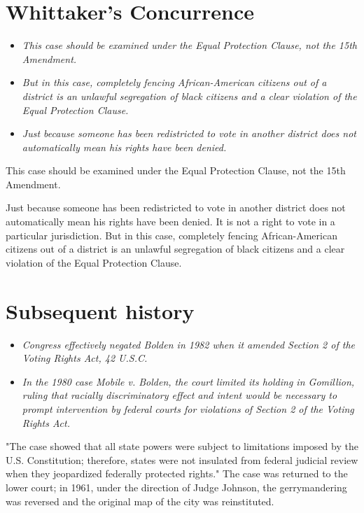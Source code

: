 \section{Whittaker's Concurrence}\label{whittakers-concurrence}

\begin{itemize}
\item
  \emph{This case should be examined under the Equal Protection Clause,
  not the 15th Amendment.}
\item
  \emph{But in this case, completely fencing African-American citizens
  out of a district is an unlawful segregation of black citizens and a
  clear violation of the Equal Protection Clause.}
\item
  \emph{Just because someone has been redistricted to vote in another
  district does not automatically mean his rights have been denied.}
\end{itemize}

This case should be examined under the Equal Protection Clause, not the
15th Amendment.

Just because someone has been redistricted to vote in another district
does not automatically mean his rights have been denied. It is not a
right to vote in a particular jurisdiction. But in this case, completely
fencing African-American citizens out of a district is an unlawful
segregation of black citizens and a clear violation of the Equal
Protection Clause.

\section{Subsequent history}\label{subsequent-history}

\begin{itemize}
\item
  \emph{Congress effectively negated Bolden in 1982 when it amended
  Section 2 of the Voting Rights Act, 42 U.S.C.}
\item
  \emph{In the 1980 case Mobile v. Bolden, the court limited its holding
  in Gomillion, ruling that racially discriminatory effect and intent
  would be necessary to prompt intervention by federal courts for
  violations of Section 2 of the Voting Rights Act.}
\end{itemize}

"The case showed that all state powers were subject to limitations
imposed by the U.S. Constitution; therefore, states were not insulated
from federal judicial review when they jeopardized federally protected
rights." The case was returned to the lower court; in 1961, under the
direction of Judge Johnson, the gerrymandering was reversed and the
original map of the city was reinstituted.

